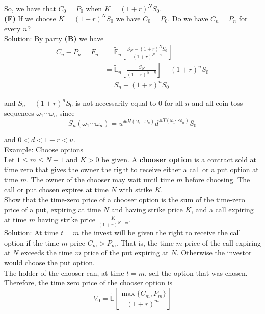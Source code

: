 \documentclass[12pt]{article}
\newlength\tindent
\renewcommand{\indent}{\hspace*{\tindent}}
\newcommand{\E}{\mathbb E}
\begin{document}
So, we have that $C_0 = P_0$ when $K = (1 + r)^NS_0$. \\

{\bf (F)} If we choose $K = (1 + r)^NS_0$ we have $C_0 = P_0$. Do we have $C_n = P_n$ for every $n$? \\

\underline{Solution}: By party {\bf (B)} we have
\begin{align*}
	C_n - P_n = F_n &= \tilde{\E}_n \left[ \frac{ S_N - (1 + r)^NS_0 }{ (1 + r)^{N - n} } \right] \\
	&= \tilde{\E}_n \left[ \frac{ S_N }{ (1 + r)^{N - n} } \right] - (1 + r)^nS_0 \\
	&= S_n - (1 + r)^nS_0 
\end{align*}

and $S_n - (1 + r)^nS_0$ is not necessarily equal to 0 for all $n$ and all coin toss sequences $\omega_1\cdots\omega_n$ since
\begin{equation*}
	S_n(\omega_1\cdots\omega_n) = u^{\#H(\omega_1\cdots\omega_n)} d^{\#T(\omega_1\cdots\omega_n)} S_0
\end{equation*}

and $0 < d < 1 + r < u$. \\

\underline{Example}: Choose options \\

\indent Let $1 \leq m \leq N - 1$ and $K > 0$ be given. A {\bf chooser option} is a contract sold at time zero that gives the owner the right to receive either a call or a put option at time $m$. The owner of the chooser may wait until time $m$ before choosing. The call or put chosen expires at time $N$ with strike $K$. \\

\indent Show that the time-zero price of a chooser option is the sum of the time-zero price of a put, expiring at time $N$ and having strike price $K$, and a call expiring at time $m$ having strike price $\frac{K}{(1 + r)^{N - m}}$. \\

\underline{Solution}: At time $t = m$ the invest will be given the right to receive the call option if the time $m$ price $C_m > P_m$. That is, the time $m$ price of the call expiring at $N$ exceeds the time $m$ price of the put expiring at $N$. Otherwise the investor would choose the put option. \\

\indent The holder of the chooser can, at time $t = m$, sell the option that was chosen. Therefore, the time zero price of the chooser option is
\begin{equation*}
	V_0 = \tilde{\E} \left[ \frac{ \max \{ C_m, P_m \} }{ (1 + r)^m } \right]
\end{equation*}
\end{document}
